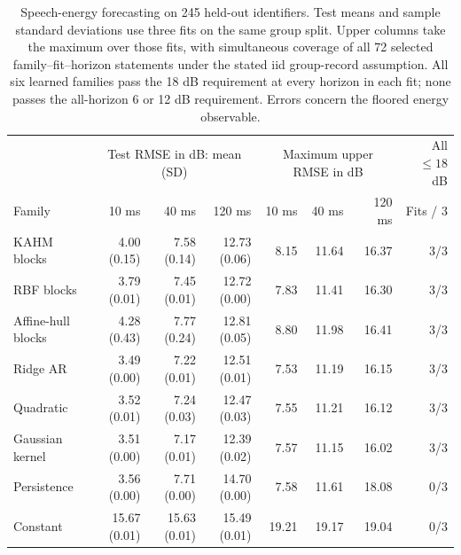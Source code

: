\begin{table}[t]
\centering\small
\setlength{\tabcolsep}{3pt}
\begin{tabular}{lrrrrrrr}
\toprule
& \multicolumn{3}{c}{Test RMSE in dB: mean (SD)} & \multicolumn{3}{c}{Maximum upper RMSE in dB} & All $\leq18$ dB\\
Family & 10 ms & 40 ms & 120 ms & 10 ms & 40 ms & 120 ms & Fits / 3\\
\midrule
KAHM blocks & 4.00 (0.15) & 7.58 (0.14) & 12.73 (0.06) & 8.15 & 11.64 & 16.37 & 3/3\\
RBF blocks & 3.79 (0.01) & 7.45 (0.01) & 12.72 (0.00) & 7.83 & 11.41 & 16.30 & 3/3\\
Affine-hull blocks & 4.28 (0.43) & 7.77 (0.24) & 12.81 (0.05) & 8.80 & 11.98 & 16.41 & 3/3\\
Ridge AR & 3.49 (0.00) & 7.22 (0.01) & 12.51 (0.01) & 7.53 & 11.19 & 16.15 & 3/3\\
Quadratic & 3.52 (0.01) & 7.24 (0.03) & 12.47 (0.03) & 7.55 & 11.21 & 16.12 & 3/3\\
Gaussian kernel & 3.51 (0.00) & 7.17 (0.01) & 12.39 (0.02) & 7.57 & 11.15 & 16.02 & 3/3\\
Persistence & 3.56 (0.00) & 7.71 (0.00) & 14.70 (0.00) & 7.58 & 11.61 & 18.08 & 0/3\\
Constant & 15.67 (0.01) & 15.63 (0.01) & 15.49 (0.01) & 19.21 & 19.17 & 19.04 & 0/3\\
\bottomrule
\end{tabular}
\caption{Speech-energy forecasting on 245 held-out identifiers. Test means and sample standard deviations use three fits on the same group split. Upper columns take the maximum over those fits, with simultaneous coverage of all 72 selected family--fit--horizon statements under the stated iid group-record assumption. All six learned families pass the 18 dB requirement at every horizon in each fit; none passes the all-horizon 6 or 12 dB requirement. Errors concern the floored energy observable.}
\label{tab:speech}
\end{table}

